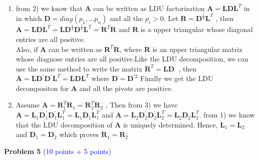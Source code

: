 \documentclass[english,onecolumn]{IEEEtran}
\begin{document}
\begin{enumerate}
    \item
    from 2) we know that $\mathbf{A}$ can be written as LDU factorization $\mathbf{A}=\mathbf{L}\mathbf{D}\mathbf{L}^{T}$ in in which $\mathbf{D}=diag(p_{1},...p_{n})$ and all the $p_{i}>0$. Let $\mathbf{R}=\mathbf{D}^{\frac{1}{2}}\mathbf{L}^{T}$ , then $\mathbf{A}=\mathbf{L}\mathbf{D}\mathbf{L}^{T}=\mathbf{L}\mathbf{D}^{\frac{1}{2}}\mathbf{D}^{\frac{1}{2}}\mathbf{L}^{T}=\mathbf{R}^{T}\mathbf{R}$ and $\mathbf{R}$ is a upper triangular whose diagonal entries are all positive.\\
    Also, if $\mathbf{A}$ can be written as $\mathbf{R}^{T}\mathbf{R}$, where $\mathbf{R}$ is an upper triangular matrix whose diagnose entries are all positive.Like the LDU decomposition, we can use the same method to write the matrix $\mathbf{R}^{T}=\mathbf{L}\mathbf{D}^{'}$  , then $\mathbf{A}=\mathbf{L}\mathbf{D}^{'}\mathbf{D}^{'}\mathbf{L}^{T}=\mathbf{L}\mathbf{D}\mathbf{L}^{T}$  where $\mathbf{D}=\mathbf{D}^{'2}$ Finally we get the LDU decompositon for $\mathbf{A}$ and all the pivots are positive.
    \item
    Assume $\mathbf{A}=\mathbf{R}^{T}_{1}\mathbf{R}_{1}=\mathbf{R}^{T}_{2}\mathbf{R}_{2}$ , Then from 3) we have  $\mathbf{A}=\mathbf{L}_{1}\mathbf{D}^{'}_{1}\mathbf{D}^{'}_{1}\mathbf{L}^{T}_{1}=\mathbf{L}_{1}\mathbf{D}_{1}\mathbf{L}^{T}_{1}$ and $\mathbf{A}=\mathbf{L}_{2}\mathbf{D}^{'}_{2}\mathbf{D}^{'}_{2}\mathbf{L}^{T}_{2}=\mathbf{L}_{2}\mathbf{D}_{2}\mathbf{L}^{T}_{2}$. from 1) we know that the LDU decomposition of $\mathbf{A}$ is uniquely determined. Hence, $\mathbf{L}_{1}=\mathbf{L}_{2}$ and $\mathbf{D}_{1}=\mathbf{D}_{2}$ which proves $\mathbf{R}_{1}=\mathbf{R}_{2}$


\end{enumerate}

\newpage
\noindent\textbf{Problem 5}
\textcolor{blue}{(10 points + 5 points)}
\end{document}
